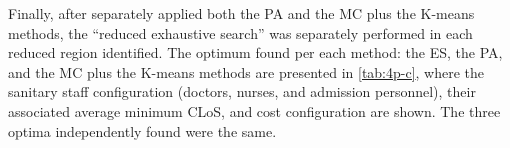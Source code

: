 Finally, after separately applied both the PA and the MC plus the
K-means methods, the \textquotedblleft{}reduced exhaustive search\textquotedblright{}
was separately performed in each reduced region identified. The optimum
found per each method: the ES, the PA, and the MC plus the K-means
methods are presented in \ref{tab:4p-c}, where the sanitary staff
configuration (doctors, nurses, and admission personnel), their associated
average minimum CLoS, and cost configuration are shown. The three
optima independently found were the same. %

{} 

